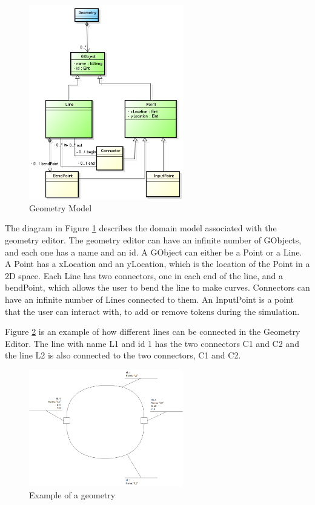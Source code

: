 \documentclass[11pt]{article}   %
\begin{document}
\begin{figure}[htp]
\begin{center}
  \includegraphics[width=0.6\textwidth]{image/geometry_model.png}
  \caption{Geometry Model}
  \label{fig:geometry_model}
\end{center}
\end{figure}

The diagram in Figure \ref{fig:geometry_model} describes the domain model associated with the geometry editor. The geometry editor can have an infinite number of GObjects, and each one has a name and an id. A GObject can either be a Point or a Line. A Point has a xLocation and an yLocation, which is the location of the Point in a 2D space.
Each Line has two connectors, one in each end of the line, and a bendPoint, which allows the user to bend the line to make curves. Connectors can have an infinite number of Lines connected to them. An InputPoint is a point that the user can interact with, to add or remove tokens during the simulation. 

Figure \ref{fig:extended_petrinet_geometry} is an example of how different lines can be connected in the Geometry Editor. The line with name L1 and id 1 has the two connectors C1 and C2 and the line L2 is also connected to the two connectors, C1 and C2. 


\begin{figure}[htp]
\begin{center}
  \includegraphics[width=0.6\textwidth]{image/example_petrinet_geometry.png}
  \caption{Example of a geometry}
  \label{fig:extended_petrinet_geometry}
\end{center}
\end{figure}
\end{document}

